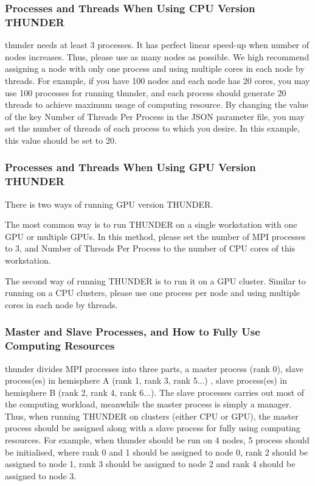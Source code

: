 \documentclass{article}
\begin{document}
            \subsubsection{Processes and Threads When Using CPU Version THUNDER}
        
                \textsf{thunder} needs at least 3 processes. It has perfect linear speed-up when number of nodes increases. Thus, please use as many nodes as possible. We high recommend assigning a node with only one process and using multiple cores in each node by threads. For example, if you have 100 nodes and each node has 20 cores, you may use 100 processes for running \textsf{thunder}, and each process should generate 20 threads to achieve maximum usage of computing resource. By changing the value of the key \textsf{Number of Threads Per Process} in the JSON parameter file, you may set the number of threads of each process to which you desire. In this example, this value should be set to 20.
            
            \subsubsection{Processes and Threads When Using GPU Version THUNDER}
        
                There is two ways of running GPU version THUNDER.
            
                The most common way is to run THUNDER on a single workstation with one GPU or multiple GPUs. In this method, please set the number of MPI processes to 3, and \textsf{Number of Threads Per Process} to the number of CPU cores of this workstation.
            
                The second way of running THUNDER is to run it on a GPU cluster. Similar to running on a CPU clusters, please use one process per node and using multiple cores in each node by threads.
            
            \subsubsection{Master and Slave Processes, and How to Fully Use Computing Resources}
            
                \textsf{thunder} divides MPI processes into three parts, a master process (rank 0), slave process(es) in hemisphere A (rank 1, rank 3, rank 5...) , slave process(es) in hemisphere B (rank 2, rank 4, rank 6...). The slave processes carries out most of the computing workload, meanwhile the master process is simply a manager. Thus, when running THUNDER on clusters (either CPU or GPU), the master process should be assigned along with a slave process for fully using computing resources. For example, when \textsf{thunder} should be run on 4 nodes, 5 process should be initialised, where rank 0 and 1 should be assigned to node 0, rank 2 should be assigned to node 1, rank 3 should be assigned to node 2 and rank 4 should be assigned to node 3.
            
\end{document}
